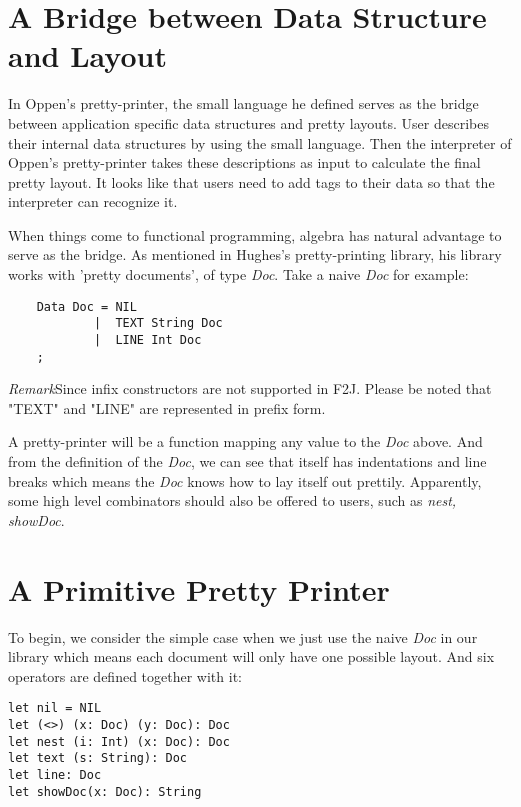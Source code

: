 \section{A Bridge between Data Structure and Layout}

In Oppen's pretty-printer\cite{oppen1980prettyprinting}, the small language he defined serves as the bridge between application specific data structures and pretty layouts. User describes their internal data structures by using the small language. Then the interpreter of Oppen's pretty-printer takes these descriptions as input to calculate the final pretty layout. It looks like that users need to add tags to their data so that the interpreter can recognize it.

When things come to functional programming, algebra has natural advantage to serve as the bridge. As mentioned in Hughes's pretty-printing library\cite{hughes1995design}, his library works with 'pretty documents', of type \textit{Doc}. Take a naive \textit{Doc} for example:

\begin{lstlisting}
    Data Doc = NIL
            |  TEXT String Doc
            |  LINE Int Doc
    ;
\end{lstlisting}
 
\emph{Remark}Since infix constructors are not supported in F2J. Please be noted that "TEXT" and "LINE" are represented in prefix form.
 
A pretty-printer will be a function mapping any value to the \textit{Doc} above. And from the definition of the \textit{Doc}, we can see that itself has indentations and line breaks which means the \textit{Doc} knows how to lay itself out prettily. Apparently, some high level combinators should also be offered to users, such as \textit{nest, showDoc}.

\section{A Primitive Pretty Printer}

To begin, we consider the simple case when we just use the naive \textit{Doc} in our library which means each document will only have one possible layout. And six operators are defined together with it:

\begin{lstlisting}
let nil = NIL
let (<>) (x: Doc) (y: Doc): Doc
let nest (i: Int) (x: Doc): Doc
let text (s: String): Doc
let line: Doc
let showDoc(x: Doc): String
\end{lstlisting}
 
